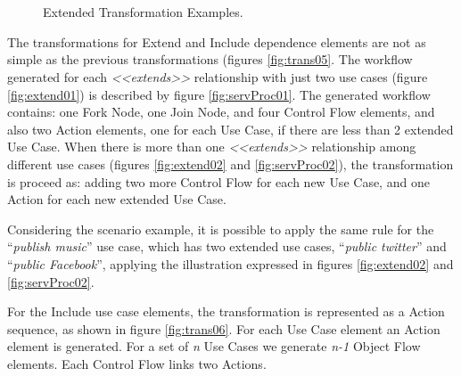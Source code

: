 \begin{figure} [ht!]
\centering

~ %
\\
~ %

\caption{Extended Transformation Examples.}
\label{fig:modelRulesUS2SP}
\end{figure}


The transformations for {\sc Extend} and {\sc Include} dependence elements are
not as simple as the previous transformations (figures \ref{fig:trans05}.
The workflow generated for each \textit{<<extends>>} relationship with just two
use cases (figure \ref{fig:extend01}) is described by figure
\ref{fig:servProc01}. The generated workflow contains: one {\sc Fork Node},
one {\sc Join Node}, and four {\sc Control Flow} elements, and also two {\sc
Action} elements, one for each {\sc Use Case}, if there are less than 2 extended
{\sc Use Case}. When there is more than one  \textit{<<extends>>} relationship
among different use cases (figures \ref{fig:extend02} and
\ref{fig:servProc02}), the transformation is proceed as: adding two more {\sc
Control Flow} for each new {\sc Use Case}, and one {\sc Action} for each new
extended {\sc Use Case}.

\begin{exampl}
Considering the scenario example, it is possible to apply
the same rule for the ``\textit{publish music}'' use case, which has two
extended use cases, ``\textit{public twitter}'' and ``\textit{public
Facebook}'', applying the illustration expressed in figures \ref{fig:extend02}
and \ref{fig:servProc02}.  
\end{exampl}

For the {\sc Include} use case elements, the transformation is represented as a
{\sc Action} sequence, as shown in figure \ref{fig:trans06}. For each {\sc Use
Case} element an {\sc Action} element  is generated. For a set of \textit{n}
{\sc Use Cases} we generate \textit{n-1} {\sc Object Flow} elements. Each
{\sc Control Flow} links two {\sc Actions}. 


